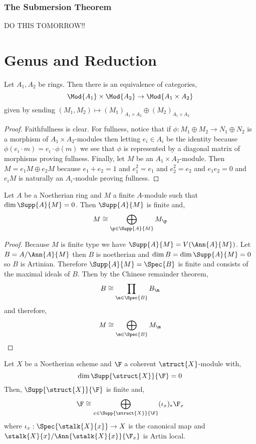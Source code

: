 \documentclass[12pt]{article}
\begin{document}
\subsubsection{The Submersion Theorem}

DO THIS TOMORROW!!

\section{Genus and Reduction}

\begin{lemma}
Let $A_1, A_2$ be rings. Then there is an equivalence of categories,
\[ \Mod{A_1} \times \Mod{A_2} \to \Mod{A_1 \times A_2} \]
given by sending $(M_1, M_2) \mapsto (M_1)_{A_1 \times A_2} \oplus (M_2)_{A_1 \times A_2}$
\end{lemma}

\begin{proof}
Faithfullness is clear. For fullness, notice that if $\phi : M_1 \oplus M_2 \to N_1 \oplus N_2$ is a morphism of $A_1 \times A_2$-modules then letting $e_i \in A_i$ be the identity because $\phi(e_i \cdot m) = e_i \cdot \phi(m)$ we see that $\phi$ is represented by a diagonal matrix of morphisms proving fullness. Finally, let $M$ be an $A_1 \times A_2$-module. Then $M = e_1 M \oplus e_2 M$ because $e_1 + e_2 = 1$ and $e_1^2 = e_1$ and $e_2^2 = e_2$ and $e_1 e_2 = 0$ and $e_i M$ is naturally an $A_i$-module proving fullness.
\end{proof}

\begin{lemma}
Let $A$ be a Noetherian ring and $M$ a finite $A$-module such that $\dim{\Supp{A}{M}} = 0$. Then $\Supp{A}{M}$ is finite and,
\[ M \cong \bigoplus_{\p \in \Supp{A}{M}} M_\p \]
\end{lemma}

\begin{proof}
Because $M$ is finite type we have $\Supp{A}{M} = V(\Ann{A}{M})$. Let $B = A / \Ann{A}{M}$ then $B$ is noetherian and $\dim{B} = \dim{\Supp{A}{M}} = 0$ so $B$ is Artinian. Therefore $\Supp{A}{M} = \Spec{B}$ is finite and consists of the maximal ideals of $B$. Then by the Chinese remainder theorem,
\[ B \cong \prod_{\m \in \Spec{B}} B_\m \]
and therefore,
\[ M \cong \bigoplus_{\m \in \Spec{B}} M_{\m} \]  
\end{proof}

\begin{lemma}
Let $X$ be a Noetherian scheme and $\F$ a coherent $\struct{X}$-module with,
\[ \dim{\Supp{\struct{X}}{\F}} = 0 \] 
Then, $\Supp{\struct{X}}{\F}$ is finite and,
\[ \F \cong \bigoplus_{x \in \Supp{\struct{X}}{\F}} (\iota_x)_* \F_x \]
where $\iota_x : \Spec{\stalk{X}{x}} \to X$ is the canonical map and $\stalk{X}{x} / \Ann{\stalk{X}{x}}{\F_x}$ is Artin local.  
\end{lemma}
\end{document}
